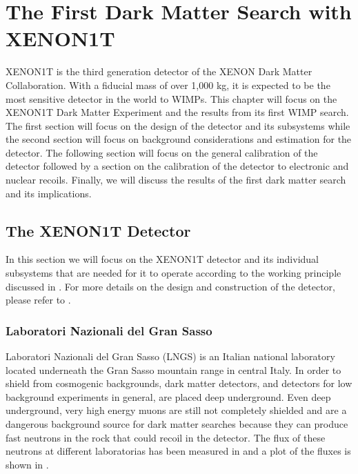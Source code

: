 

\pagestyle{cu}
\graphicspath{{./Chapter3/images/}}

\chapter[The First Dark Matter Search with XENON1T][The First Dark Matter Search with XENON1T]{The First Dark Matter Search with XENON1T}

XENON1T is the third generation detector of the XENON Dark Matter Collaboration.  With a fiducial mass of over 1,000 kg, it is expected to be the most sensitive detector in the world to WIMPs.  This chapter will focus on the XENON1T Dark Matter Experiment and the results from its first WIMP search.  The first section will focus on the design of the detector and its subsystems while the second section will focus on background considerations and estimation for the detector.  The following section will focus on the general calibration of the detector followed by a section on the calibration of the detector to electronic and nuclear recoils.  Finally, we will discuss the results of the first dark matter search and its implications.


\section{The XENON1T Detector}
\label{sec:xe1t_detector}

In this section we will focus on the XENON1T detector and its individual subsystems that are needed for it to operate according to the working principle discussed in .  For more details on the design and construction of the detector, please refer to .

\subsection{ Laboratori Nazionali del Gran Sasso}

 Laboratori Nazionali del Gran Sasso (LNGS)  is an Italian national laboratory located underneath the Gran Sasso mountain range in central Italy.  In order to shield from cosmogenic backgrounds, dark matter detectors, and detectors for low background experiments in general, are placed deep underground.  Even deep underground, very high energy muons are still not completely shielded and are a dangerous background source for dark matter searches because they can produce fast neutrons in the rock that could recoil in the detector.  The flux of these neutrons at different laboratorias has been measured in  and a plot of the fluxes is shown in .
 
